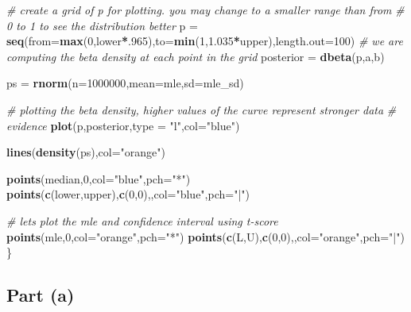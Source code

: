 \documentclass[
]{article}
\newenvironment{Shaded}{\begin{snugshade}}{\end{snugshade}}
\newcommand{\AttributeTok}[1]{\textcolor[rgb]{0.13,0.29,0.53}{#1}}
\newcommand{\CommentTok}[1]{\textcolor[rgb]{0.56,0.35,0.01}{\textit{#1}}}
\newcommand{\DecValTok}[1]{\textcolor[rgb]{0.00,0.00,0.81}{#1}}
\newcommand{\FloatTok}[1]{\textcolor[rgb]{0.00,0.00,0.81}{#1}}
\newcommand{\FunctionTok}[1]{\textcolor[rgb]{0.13,0.29,0.53}{\textbf{#1}}}
\newcommand{\NormalTok}[1]{#1}
\newcommand{\OtherTok}[1]{\textcolor[rgb]{0.56,0.35,0.01}{#1}}
\newcommand{\SpecialCharTok}[1]{\textcolor[rgb]{0.81,0.36,0.00}{\textbf{#1}}}
\newcommand{\StringTok}[1]{\textcolor[rgb]{0.31,0.60,0.02}{#1}}
\begin{document}
\begin{Shaded}
\begin{Highlighting}[]
  \CommentTok{\# create a grid of p for plotting. you may change to a smaller range than from}
  \CommentTok{\# 0 to 1 to see the distribution better}
\NormalTok{  p }\OtherTok{=} \FunctionTok{seq}\NormalTok{(}\AttributeTok{from=}\FunctionTok{max}\NormalTok{(}\DecValTok{0}\NormalTok{,lower}\SpecialCharTok{*}\NormalTok{.}\DecValTok{965}\NormalTok{),}\AttributeTok{to=}\FunctionTok{min}\NormalTok{(}\DecValTok{1}\NormalTok{,}\FloatTok{1.035}\SpecialCharTok{*}\NormalTok{upper),}\AttributeTok{length.out=}\DecValTok{100}\NormalTok{)}
  \CommentTok{\# we are computing the beta density at each point in the grid}
\NormalTok{  posterior }\OtherTok{=} \FunctionTok{dbeta}\NormalTok{(p,a,b)}
  
\NormalTok{  ps }\OtherTok{=} \FunctionTok{rnorm}\NormalTok{(}\AttributeTok{n=}\DecValTok{1000000}\NormalTok{,}\AttributeTok{mean=}\NormalTok{mle,}\AttributeTok{sd=}\NormalTok{mle\_sd)}
  
  \CommentTok{\# plotting the beta density, higher values of the curve represent stronger data}
  \CommentTok{\# evidence}
  \FunctionTok{plot}\NormalTok{(p,posterior,}\AttributeTok{type =} \StringTok{"l"}\NormalTok{,}\AttributeTok{col=}\StringTok{"blue"}\NormalTok{)}
  
  \FunctionTok{lines}\NormalTok{(}\FunctionTok{density}\NormalTok{(ps),}\AttributeTok{col=}\StringTok{"orange"}\NormalTok{)}
  
  \FunctionTok{points}\NormalTok{(median,}\DecValTok{0}\NormalTok{,}\AttributeTok{col=}\StringTok{"blue"}\NormalTok{,}\AttributeTok{pch=}\StringTok{"*"}\NormalTok{)}
  \FunctionTok{points}\NormalTok{(}\FunctionTok{c}\NormalTok{(lower,upper),}\FunctionTok{c}\NormalTok{(}\DecValTok{0}\NormalTok{,}\DecValTok{0}\NormalTok{),,}\AttributeTok{col=}\StringTok{"blue"}\NormalTok{,}\AttributeTok{pch=}\StringTok{"|"}\NormalTok{)}
  
  \CommentTok{\# let\textquotesingle{}s plot the mle and confidence interval using t{-}score}
  \FunctionTok{points}\NormalTok{(mle,}\DecValTok{0}\NormalTok{,}\AttributeTok{col=}\StringTok{"orange"}\NormalTok{,}\AttributeTok{pch=}\StringTok{"*"}\NormalTok{)}
  \FunctionTok{points}\NormalTok{(}\FunctionTok{c}\NormalTok{(L,U),}\FunctionTok{c}\NormalTok{(}\DecValTok{0}\NormalTok{,}\DecValTok{0}\NormalTok{),,}\AttributeTok{col=}\StringTok{"orange"}\NormalTok{,}\AttributeTok{pch=}\StringTok{"|"}\NormalTok{)}
\NormalTok{\}}
\end{Highlighting}
\end{Shaded}

\hypertarget{part-a-1}{%
\subsection{Part (a)}\label{part-a-1}}
\end{document}
